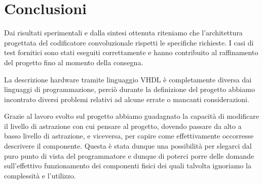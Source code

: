 \documentclass[12pt]{article} %
\begin{document}
	\section{Conclusioni}
	
		Dai risultati sperimentali e dalla sintesi ottenuta riteniamo che l'architettura
		progettata del codificatore convoluzionale rispetti le specifiche
		richieste. I casi di test fornitici sono stati eseguiti correttamente e
		hanno contribuito al raffinamento del progetto fino al momento della consegna.
		\newline
		
		La descrizione hardware tramite linguaggio VHDL è completamente diversa dai 
		linguaggi di programmazione, perciò durante la definizione del progetto abbiamo 
		incontrato diversi problemi relativi ad alcune errate o mancanti considerazioni. 
		
		Grazie al lavoro svolto sul progetto abbiamo guadagnato la capacità di modificare 
		il livello di astrazione con cui pensare al progetto, dovendo passare da alto 
		a basso livello di astrazione, e viceversa, per capire come effettivamente 
		occorresse descrivere il componente. Questa è stata dunque una possibilità 
		per slegarci dal puro punto di vista del programmatore e dunque di poterci porre 
		delle domande sull’effettivo funzionamento dei componenti fisici dei quali 
		talvolta ignoriamo la complessità e l’utilizzo.
	
%
\end{document}

